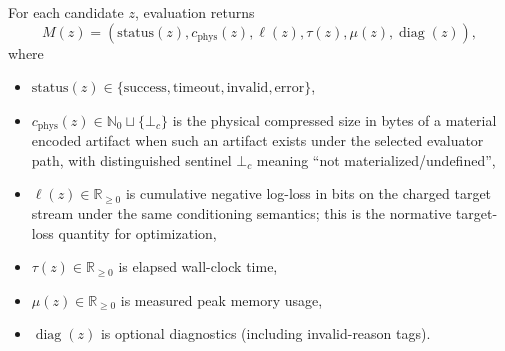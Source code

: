 \documentclass[11pt]{article}
\begin{document}
For each candidate $z$, evaluation returns
\[
M(z) = (\mathrm{status}(z), c_{\mathrm{phys}}(z), \ell(z), \tau(z), \mu(z), \operatorname{diag}(z)),
\]
where
\begin{itemize}
    \item $\mathrm{status}(z) \in \{\mathrm{success},\mathrm{timeout},\mathrm{invalid},\mathrm{error}\}$,
    \item $c_{\mathrm{phys}}(z)\in\mathbb{N}_0\sqcup\{\bot_c\}$ is the
    physical compressed size in bytes of a material encoded artifact when such
    an artifact exists under the selected evaluator path, with distinguished
    sentinel $\bot_c$ meaning ``not materialized/undefined'',
    \item $\ell(z) \in \mathbb{R}_{\ge 0}$ is cumulative negative log-loss in
    bits on the charged target stream under the same conditioning semantics;
    this is the normative target-loss quantity for optimization,
    \item $\tau(z) \in \mathbb{R}_{\ge 0}$ is elapsed wall-clock time,
    \item $\mu(z) \in \mathbb{R}_{\ge 0}$ is measured peak memory usage,
    \item $\operatorname{diag}(z)$ is optional diagnostics (including invalid-reason tags).
\end{itemize}
\end{document}
